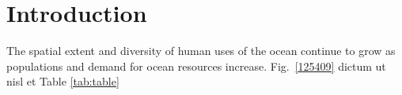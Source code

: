 \section{Introduction}
\label{introduction}

The spatial extent and diversity of human uses of the ocean continue to grow as populations and demand for ocean resources increase.  Fig.~\ref{125409} dictum ut nisl et Table \ref{tab:table}
